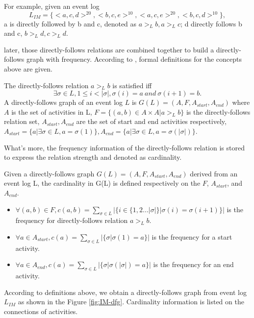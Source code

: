 For example, given an event log \[L_{IM}=\{<a,c,d>^{20},<b,c,e>^{10},<a,c,e>^{20},<b,c,d>^{10}\},\] 
a is directly followed by b and c, denoted as $a >_L b, a>_L c$; d directly follows b and c, $b>_L d, c>_L d$.

later, those directly-follows relations are combined together to build a directly-follows graph with frequency. According to  \cite{van2016data, leemans2013discovering}, formal definitions for the concepts above are given.
\begin{definition}
 The directly-follows relation $a >_L b$ is satisfied iff \[\exists\sigma \in L, 1 \leq i < \vert \sigma \vert , \sigma(i)=a \ and \ \sigma(i+1)=b.\]
 A directly-follows graph of an event log $L$ is $G(L) = (A, F , A_{start}, A_{end}) $ where $A$ is the set of activities in L, $ F=\{ (a,b) \in A \times A | a >_L b \} $ is the directly-follows relation set, $A_{start}, A_{end}$ are the set of start and end activities respectively, $A_{start}=\{a\vert \exists \sigma \in L, a=\sigma(1)\}, A_{end}=\{a\vert \exists \sigma \in L, a=\sigma(\vert \sigma\vert)\}$.
\end{definition}
What's more, the frequency information of the directly-follows relation is stored to express the relation strength and denoted as cardinality. 
\begin{definition}
Given a directly-follows graph $G(L)=(A, F , A_{start}, A_{end})$ derived from an event log L, the cardinality in G(L) is defined respectively on the $F$, $A_{start}$, and $A_{end}$.  
	\begin{itemize}
		\itemsep-0.5em
		\item $\forall (a,b)\in F, c(a,b)=\sum_{\sigma \in L} |\{ i\in \{1,2...|\sigma|\} \vert \sigma(i)=\sigma(i+1)\} | $ is the frequency for directly-follows relation $a>_L b$. 
		\item $\forall a \in A_{start}, c(a)=\sum_{\sigma \in L} |\{\sigma \vert \sigma(1) = a\}|$ is the frequency for a start activity.
		\item $\forall a \in A_{end}, c(a)=\sum_{\sigma \in L} |\{\sigma \vert \sigma(|\sigma|) = a\}|$ is the frequency for an end activity.
	\end{itemize}	
\end{definition}
According to definitions above, we obtain a directly-follows graph from event log $L_{IM}$ as shown in the Figure \ref{fig:IM-dfg}. Cardinality information is listed on the connections of activities.

